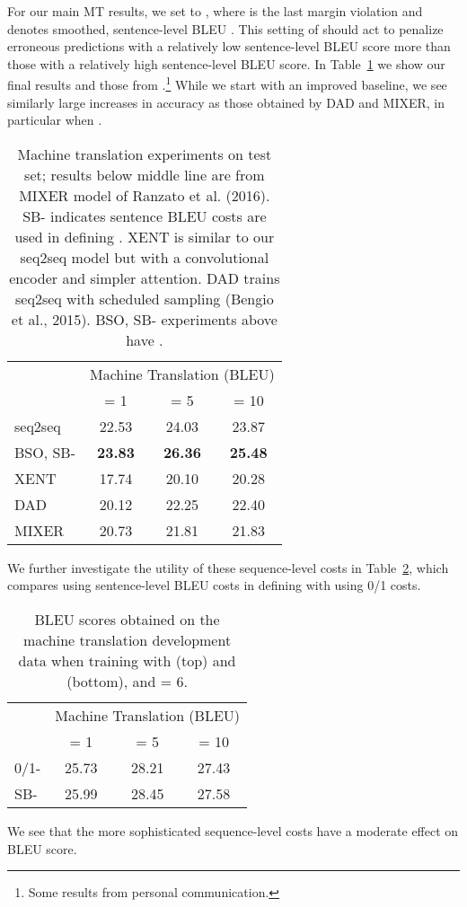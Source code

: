 \documentclass[11pt,letterpaper]{article}
\begin{document}
For our main MT results, we set  to , where  is the last margin violation and  denotes smoothed, sentence-level BLEU \cite{chen14systematic}. This setting of  should act to penalize erroneous predictions with a relatively low sentence-level BLEU score more than those with a relatively high sentence-level BLEU score. In Table~\ref{tab:mtfinal} we show our final results and those from .\footnote{Some results from personal communication.} While we start with an improved baseline, we see similarly large increases in accuracy as those obtained by DAD and MIXER, in particular when . 

\begin{table}[t!]
  \centering
  \begin{tabular}{lccc}
    \toprule
    & \multicolumn{3}{c}{Machine Translation (BLEU) } \\ 
    &   = 1 &  = 5 &  = 10 \\ 
    \midrule
    seq2seq & 22.53 & 24.03 & 23.87 \\
    BSO, SB- & \textbf{23.83} & \textbf{26.36} & \textbf{25.48} \\
    \midrule
    XENT & 17.74 & 20.10 & 20.28 \\
    DAD & 20.12 & 22.25 & 22.40 \\ 
    MIXER & 20.73 & 21.81 & 21.83 \\    
    \bottomrule
  \end{tabular}
  \caption{Machine translation experiments on test set; results below middle line are from MIXER model of Ranzato et al. (2016). SB- indicates sentence BLEU costs are used in defining .  XENT is similar to our seq2seq model but with a convolutional encoder and simpler attention. DAD trains seq2seq with scheduled sampling (Bengio et al., 2015). BSO, SB- experiments above have .}
  \label{tab:mtfinal}
\end{table}

We further investigate the utility of these sequence-level costs in Table~\ref{tab:mtdelt}, which compares using sentence-level BLEU costs in defining  with using 0/1 costs.
\begin{table}[t!]
  \centering
  \begin{tabular}{lccc}
    \toprule
    & \multicolumn{3}{c}{Machine Translation (BLEU)} \\ 
     &   = 1 &  = 5 &  = 10 \\ 
    \midrule
    0/1- & 25.73  & 28.21 & 27.43  \\  
        SB- & 25.99  & 28.45 & 27.58 \\  
    \bottomrule
  \end{tabular}
  \caption{BLEU scores obtained on the machine translation development data when training with  (top) and  (bottom), and  = 6. }
\label{tab:mtdelt}
\end{table}
We see that the more sophisticated sequence-level costs have a moderate effect on BLEU score.
\end{document}
